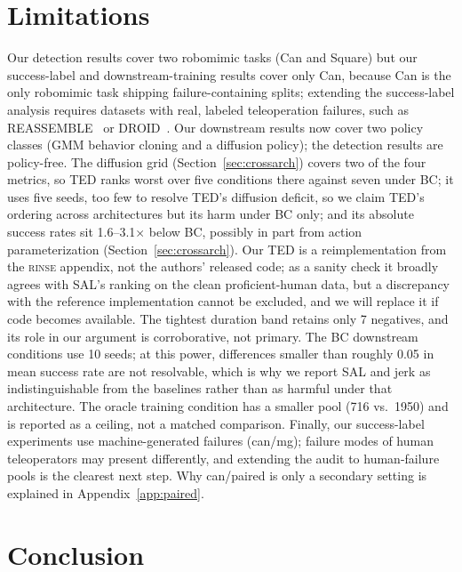 \documentclass[10pt]{article}
\newcommand{\rinse}{\textsc{rinse}}
\begin{document}
\section{Limitations}
\label{sec:limitations}

Our detection results cover two robomimic tasks (Can and Square) but our
success-label and downstream-training results cover only Can, because Can is
the only robomimic task shipping failure-containing splits; extending the
success-label analysis requires datasets with real, labeled teleoperation
failures, such as \mbox{REASSEMBLE}~\citep{reassemble} or DROID~\citep{droid}.
Our downstream results now cover two policy classes (GMM behavior
cloning and a diffusion policy); the detection results are policy-free. The
diffusion grid (Section~\ref{sec:crossarch}) covers two of the four metrics,
so TED ranks worst over five conditions there against seven under BC; it
uses five seeds, too few to resolve TED's diffusion deficit, so we claim
TED's ordering across architectures but its harm under BC only; and its
absolute success rates sit 1.6--3.1$\times$ below BC, possibly in part from
action parameterization (Section~\ref{sec:crossarch}).
Our TED is a reimplementation from the \rinse{} appendix, not the authors'
released code; as a sanity check it broadly agrees with SAL's ranking on the
clean proficient-human data, but a discrepancy with the reference
implementation cannot be excluded, and we will replace it if code becomes
available. The tightest duration band retains only 7 negatives, and its
role in our argument is corroborative, not primary. The BC downstream
conditions use 10 seeds; at this power, differences smaller than roughly
0.05 in mean success rate are not resolvable, which is why we report SAL and
jerk as indistinguishable from the baselines rather than as harmful under
that architecture. The oracle training
condition has a smaller pool (716 vs.\ 1950) and is reported as a ceiling,
not a matched comparison. Finally, our success-label experiments use
machine-generated failures (can/mg); failure modes of human teleoperators
may present differently, and extending the audit to human-failure pools is
the clearest next step. Why can/paired is only a secondary setting is
explained in Appendix~\ref{app:paired}.

\section{Conclusion}
\end{document}
